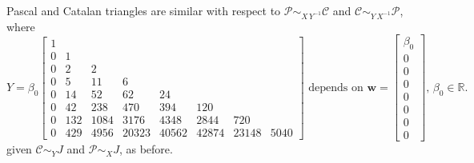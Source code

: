 \begin{example}
Pascal and Catalan triangles are similar with respect to
$\mathcal{P} \sim_{X\,Y^{-1}}\mathcal{C}$ and $\mathcal{C}
\sim_{Y\,X^{-1}}\mathcal{P}$, where 
\begin{displaymath}
Y = \beta_{0} \left[\begin{matrix}1 &  &  &  &  &  &  & \\0 & 1 &  &  &  &  &  & \\0 & 2 & 2 &  &  &  &  & \\0 & 5 & 11 & 6 &  &  &  & \\0 & 14 & 52 & 62 & 24 &  &  & \\0 & 42 & 238 & 470 & 394 & 120 &  & \\0 & 132 & 1084 & 3176 & 4348 & 2844 & 720 & \\0 & 429 & 4956 & 20323 & 40562 & 42874 & 23148 & 5040\end{matrix}\right]
\,\,\text{depends on}\,\,\boldsymbol{w}= \left[\begin{matrix} \beta_{0}\\0\\0\\0\\0\\0\\0\\0 \end{matrix}\right],\,\beta_{0}\in\mathbb{R}.
\end{displaymath}
given $\mathcal{C}\sim_{Y}J$ and $\mathcal{P}\sim_{X}J$, as before.
\end{example}


